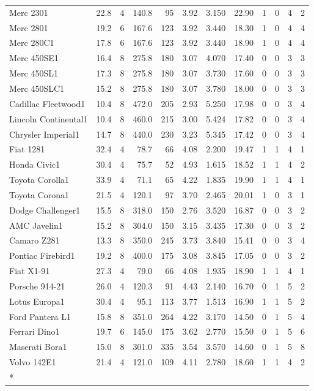 \documentclass[a4paper, nobind]{templates/ociamthesis}
\begin{document}
\begin{longtable}{lrrrrrrrrrrr}
\addlinespace
Merc 2301 & 22.8 & 4 & 140.8 & 95 & 3.92 & 3.150 & 22.90 & 1 & 0 & 4 & 2\\
Merc 2801 & 19.2 & 6 & 167.6 & 123 & 3.92 & 3.440 & 18.30 & 1 & 0 & 4 & 4\\
Merc 280C1 & 17.8 & 6 & 167.6 & 123 & 3.92 & 3.440 & 18.90 & 1 & 0 & 4 & 4\\
Merc 450SE1 & 16.4 & 8 & 275.8 & 180 & 3.07 & 4.070 & 17.40 & 0 & 0 & 3 & 3\\
Merc 450SL1 & 17.3 & 8 & 275.8 & 180 & 3.07 & 3.730 & 17.60 & 0 & 0 & 3 & 3\\
\addlinespace
Merc 450SLC1 & 15.2 & 8 & 275.8 & 180 & 3.07 & 3.780 & 18.00 & 0 & 0 & 3 & 3\\
Cadillac Fleetwood1 & 10.4 & 8 & 472.0 & 205 & 2.93 & 5.250 & 17.98 & 0 & 0 & 3 & 4\\
Lincoln Continental1 & 10.4 & 8 & 460.0 & 215 & 3.00 & 5.424 & 17.82 & 0 & 0 & 3 & 4\\
Chrysler Imperial1 & 14.7 & 8 & 440.0 & 230 & 3.23 & 5.345 & 17.42 & 0 & 0 & 3 & 4\\
Fiat 1281 & 32.4 & 4 & 78.7 & 66 & 4.08 & 2.200 & 19.47 & 1 & 1 & 4 & 1\\
\addlinespace
Honda Civic1 & 30.4 & 4 & 75.7 & 52 & 4.93 & 1.615 & 18.52 & 1 & 1 & 4 & 2\\
Toyota Corolla1 & 33.9 & 4 & 71.1 & 65 & 4.22 & 1.835 & 19.90 & 1 & 1 & 4 & 1\\
Toyota Corona1 & 21.5 & 4 & 120.1 & 97 & 3.70 & 2.465 & 20.01 & 1 & 0 & 3 & 1\\
Dodge Challenger1 & 15.5 & 8 & 318.0 & 150 & 2.76 & 3.520 & 16.87 & 0 & 0 & 3 & 2\\
AMC Javelin1 & 15.2 & 8 & 304.0 & 150 & 3.15 & 3.435 & 17.30 & 0 & 0 & 3 & 2\\
\addlinespace
Camaro Z281 & 13.3 & 8 & 350.0 & 245 & 3.73 & 3.840 & 15.41 & 0 & 0 & 3 & 4\\
Pontiac Firebird1 & 19.2 & 8 & 400.0 & 175 & 3.08 & 3.845 & 17.05 & 0 & 0 & 3 & 2\\
Fiat X1-91 & 27.3 & 4 & 79.0 & 66 & 4.08 & 1.935 & 18.90 & 1 & 1 & 4 & 1\\
Porsche 914-21 & 26.0 & 4 & 120.3 & 91 & 4.43 & 2.140 & 16.70 & 0 & 1 & 5 & 2\\
Lotus Europa1 & 30.4 & 4 & 95.1 & 113 & 3.77 & 1.513 & 16.90 & 1 & 1 & 5 & 2\\
\addlinespace
Ford Pantera L1 & 15.8 & 8 & 351.0 & 264 & 4.22 & 3.170 & 14.50 & 0 & 1 & 5 & 4\\
Ferrari Dino1 & 19.7 & 6 & 145.0 & 175 & 3.62 & 2.770 & 15.50 & 0 & 1 & 5 & 6\\
Maserati Bora1 & 15.0 & 8 & 301.0 & 335 & 3.54 & 3.570 & 14.60 & 0 & 1 & 5 & 8\\
Volvo 142E1 & 21.4 & 4 & 121.0 & 109 & 4.11 & 2.780 & 18.60 & 1 & 1 & 4 & 2\\*
\end{longtable}
\end{document}

